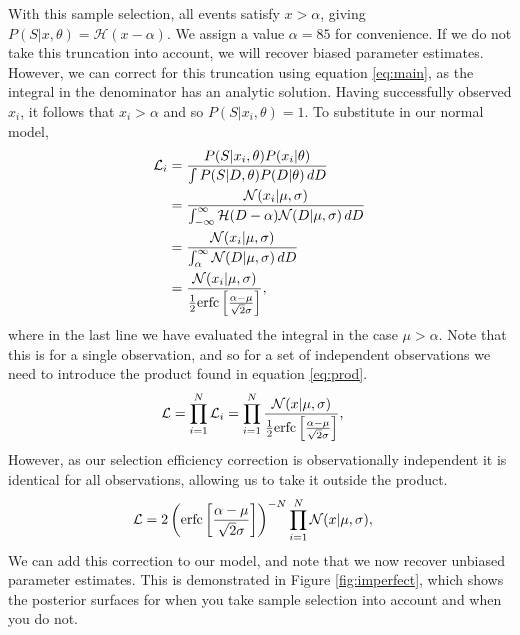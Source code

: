 \documentclass[a4paper,fleqn,usenatbib]{mnras}
\begin{document}
With this sample selection, all events satisfy $x > \alpha$, giving $P(S|x,\theta) = \mathcal{H}(x - \alpha)$. We assign a value $\alpha=85$ for convenience. If we do not take this truncation into account, we will recover biased parameter estimates. However, we can correct for this truncation using equation \eqref{eq:main}, as the integral in the denominator has an analytic solution. Having successfully observed $x_i$, it follows that $x_i > \alpha$ and so $P(S|x_i,\theta) = 1$. To substitute in our normal model,
\begin{align}
\mathcal{L}_i &= \frac{P(S|x_i,\theta) P(x_i|\theta)}{\int P(S | D, \theta) P(D|\theta)\, dD} \\
&= \frac{ \mathcal{N}(x_i|\mu, \sigma)}{\int_{-\infty}^\infty \mathcal{H}(D - \alpha) \mathcal{N}(D|\mu, \sigma)\, dD} \\
&= \frac{ \mathcal{N}(x_i|\mu, \sigma)}{\int_{\alpha}^\infty \mathcal{N}(D|\mu, \sigma)\, dD} \\
&= \frac{ \mathcal{N}(x_i|\mu, \sigma)}{\frac{1}{2} {\rm erfc}\left[ \frac{\alpha - \mu}{\sqrt{2}\sigma} \right]}, 
\end{align}
where in the last line we have evaluated the integral in the case $\mu > \alpha$. Note that this is for a single observation, and so for a set of independent observations we need to introduce the product found in equation \eqref{eq:prod}. 
\begin{align}
\mathcal{L} &= \prod_{i=1}^N \mathcal{L}_i =  \prod_{i=1}^N \frac{ \mathcal{N}(x|\mu, \sigma)}{\frac{1}{2} {\rm erfc}\left[ \frac{\alpha - \mu}{\sqrt{2}\sigma} \right]}, 
\end{align}
However, as our selection efficiency correction is observationally independent it is identical for all observations, allowing us to take it outside the product.
\begin{align}
\mathcal{L} &= 2 \left( {\rm erfc}\left[ \frac{\alpha - \mu}{\sqrt{2}\sigma} \right] \right)^{-N}\prod_{i=1}^N  \mathcal{N}(x|\mu, \sigma), 
\end{align}
We can add this correction to our model, and note that we now recover unbiased parameter estimates. This is demonstrated in Figure \ref{fig:imperfect}, which shows the posterior surfaces for when you take sample selection into account and when you do not.
\end{document}
